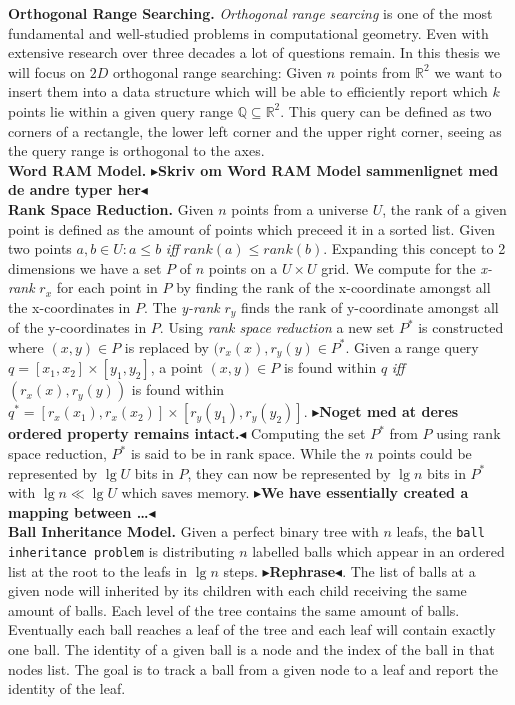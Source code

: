 \documentclass[twoside,11pt,openright]{report}
\newcommand{\todo}[1]{{\color[rgb]{.5,0,0}\textbf{$\blacktriangleright$#1$\blacktriangleleft$}}}
\begin{document}
\noindent \textbf{Orthogonal Range Searching.} \emph{Orthogonal range searcing} is one of the most fundamental and well-studied problems in computational geometry. Even with extensive research over three decades a lot of questions remain. In this thesis we will focus on $2D$ orthogonal range searching: Given $n$ points from $\mathbb{R}^2$ we want to insert them into a data structure which will be able to efficiently report which $k$ points lie within a given query range $\mathbb{Q} \subseteq \mathbb{R}^2$. This query can be defined as two corners of a rectangle, the lower left corner and the upper right corner, seeing as the query range is orthogonal to the axes. \\

\noindent \textbf{Word RAM Model.} \todo{Skriv om Word RAM Model sammenlignet med de andre typer her}\\

\noindent \textbf{Rank Space Reduction.} Given $n$ points from a universe $U$, the rank of a given point is defined as the amount of points which preceed it in a sorted list. Given two points $a,b \in U: a \leq b$ \emph{iff} $rank(a) \leq rank(b)$. Expanding this concept to 2 dimensions we have a set $P$ of $n$ points on a $U \times U$ grid. We compute for the \emph{x-rank} $r_x$ for each point in $P$ by finding the rank of the x-coordinate amongst all the x-coordinates in $P$. The \emph{y-rank} $r_y$ finds the rank of y-coordinate amongst all of the y-coordinates in $P$. Using \emph{rank space reduction} a new set $P^*$ is constructed where $(x,y) \in P$ is replaced by $(r_x(x), r_y(y) \in P^*$. Given a range query $q = [x_1, x_2] \times [y_1, y_2]$, a point $(x,y) \in P$ is found within $q$ \emph{iff} $(r_x(x), r_y(y))$ is found within $q^* = [r_x(x_1), r_x(x_2)] \times [r_y(y_1), r_y(y_2)]$. \todo{Noget med at deres ordered property remains intact.} Computing the set $P^*$ from $P$ using rank space reduction, $P^*$ is said to be in rank space. While the $n$ points could be represented by $\lg U$ bits in $P$, they can now be represented by $\lg n$ bits in $P^*$ with $\lg n \ll \lg U$ which saves memory. \todo{We have essentially created a mapping between \dots } \\

\noindent \textbf{Ball Inheritance Model.} Given a perfect binary tree with $n$ leafs, the \texttt{ball inheritance problem} is distributing $n$ labelled balls which appear in an ordered list at the root to the leafs in $\lg n$ steps. \todo{Rephrase}. The list of balls at a given node will inherited by its children with each child receiving the same amount of balls. Each level of the tree contains the same amount of balls. Eventually each ball reaches a leaf of the tree and each leaf will contain exactly one ball. The identity of a given ball is a node and the index of the ball in that nodes list. The goal is to track a ball from a given node to a leaf and report the identity of the leaf. \\
\end{document}
